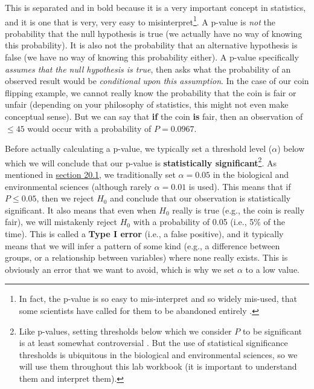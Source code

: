 \documentclass[
]{scrbook}
\begin{document}
This is separated and in bold because it is a very important concept in statistics, and it is one that is very, very easy to misinterpret\footnote{In fact, the p-value is so easy to mis-interpret and so widely mis-used, that some scientists have called for them to be abandoned entirely \citetext{\citealp{Wasserstein2016}; \citealp[but see][]{Stanton-Geddes2014}; \citealp{Mayo2019}}.}.
A p-value is \emph{not} the probability that the null hypothesis is true (we actually have no way of knowing this probability).
It is also not the probability that an alternative hypothesis is false (we have no way of knowing this probability either).
A p-value specifically \emph{assumes that the null hypothesis is true}, then asks what the probability of an observed result would be \emph{conditional upon this assumption}.
In the case of our coin flipping example, we cannot really know the probability that the coin is fair or unfair (depending on your philosophy of statistics, this might not even make conceptual sense).
But we can say that \textbf{if} the coin \textbf{is} fair, then an observation of \(\leq 45\) would occur with a probability of \(P = 0.0967\).

Before actually calculating a p-value, we typically set a threshold level (\(\alpha\)) below which we will conclude that our p-value is \textbf{statistically significant}\footnote{Like p-values, setting thresholds below which we consider \(P\) to be significant is at least somewhat controversial \citep{McShane2019, Mayo2021}. But the use of statistical significance thresholds is ubiquitous in the biological and environmental sciences, so we will use them throughout this lab workbook (it is important to understand them and interpret them).}.
As mentioned in \protect\hyperlink{how-ridiculous-is-our-hypothesis}{section 20.1}, we traditionally set \(\alpha= 0.05\) in the biological and environmental sciences (although rarely \(\alpha = 0.01\) is used).
This means that if \(P \leq 0.05\), then we reject \(H_{0}\) and conclude that our observation is statistically significant.
It also means that even when \(H_{0}\) really is true (e.g., the coin is really fair), we will mistakenly reject \(H_{0}\) with a probability of 0.05 (i.e., 5\% of the time).
This is called a \textbf{Type I error} (i.e., a false positive), and it typically means that we will infer a pattern of some kind (e.g., a difference between groups, or a relationship between variables) where none really exists.
This is obviously an error that we want to avoid, which is why we set \(\alpha\) to a low value.
\end{document}
